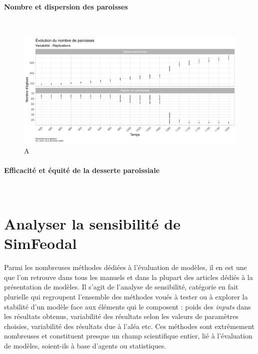 \paragraph{Nombre et dispersion des paroisses}~\\

\begin{figure}[H]
	\centering
	\includegraphics[width=\linewidth]{img/results_6_6/Paroisses_Nb_Haut.pdf}
	\caption{A}
	\label{}
\end{figure}


\paragraph{Efficacité et équité de la desserte paroissiale}~\\



\clearpage
\section{Analyser la sensibilité de SimFeodal}

Parmi les nombreuses méthodes dédiées à l'évaluation de modèles, il en est une que l'on retrouve dans tous les manuels et dans la plupart des articles dédiés à la présentation de modèles.
Il s'agit de l'analyse de sensibilité, catégorie en fait plurielle qui regroupent l'ensemble des méthodes voués à tester ou à explorer la stabilité d'un modèle face aux éléments qui le composent : poids des \textit{inputs} dans les résultats obtenus, variabilité des résultats selon les valeurs de paramètres choisies, variabilité des résultats due à l'aléa etc.
Ces méthodes sont extrêmement nombreuses et constituent presque un champ scientifique entier, lié à l'évaluation de modèles, soient-ils à base d'agents ou statistiques.

